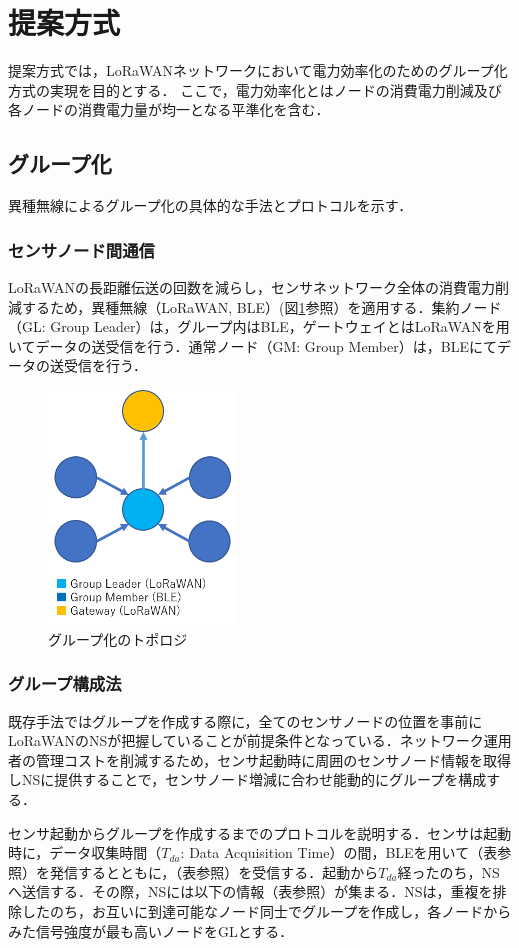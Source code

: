 \documentclass[Japanese]{dicomopapers}
\begin{document}
\section{提案方式}
提案方式では，LoRaWANネットワークにおいて電力効率化のためのグループ化方式の実現を目的とする．
ここで，電力効率化とはノードの消費電力削減及び各ノードの消費電力量が均一となる平準化を含む．

\subsection{グループ化}
異種無線によるグループ化の具体的な手法とプロトコルを示す．

\subsubsection{センサノード間通信}
LoRaWANの長距離伝送の回数を減らし，センサネットワーク全体の消費電力削減するため，異種無線（LoRaWAN, BLE）(図\ref{group_topology}参照）を適用する．集約ノード（GL: Group Leader）は，グループ内はBLE，ゲートウェイとはLoRaWANを用いてデータの送受信を行う．通常ノード（GM: Group Member）は，BLEにてデータの送受信を行う．

\begin{figure}[h]
    \centering
    \includegraphics[width=5cm]{./img/group_topology.png}
    \caption{グループ化のトポロジ}
    \label{group_topology}
\end{figure}

\subsubsection{グループ構成法}
既存手法\cite{group}ではグループを作成する際に，全てのセンサノードの位置を事前にLoRaWANのNSが把握していることが前提条件となっている．ネットワーク運用者の管理コストを削減するため，センサ起動時に周囲のセンサノード情報を取得しNSに提供することで，センサノード増減に合わせ能動的にグループを構成する．
\par
センサ起動からグループを作成するまでのプロトコルを説明する．センサは起動時に，データ収集時間（$T_{da}$: Data Acquisition Time）の間，BLEを用いて（表参照）を発信するとともに，（表参照）を受信する．起動から$T_{da}$経ったのち，NSへ送信する．その際，NSには以下の情報（表参照）が集まる．NSは，重複を排除したのち，お互いに到達可能なノード同士でグループを作成し，各ノードからみた信号強度が最も高いノードをGLとする．
\end{document}
